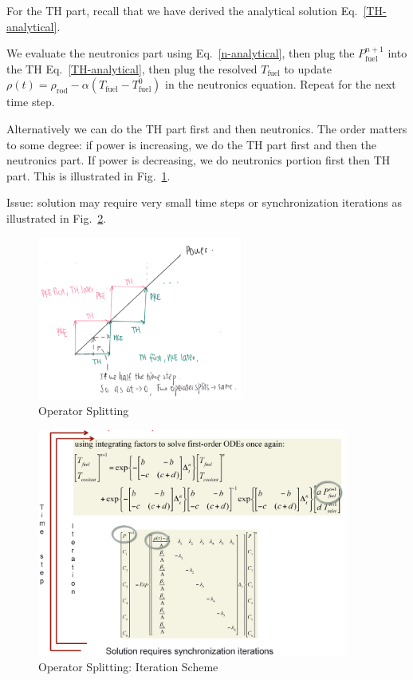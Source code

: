 \documentclass{school-22.211-notes}
\begin{document}
For the TH part, recall that we have derived the analytical solution Eq.~\ref{TH-analytical}.

\clearpage
{}
We evaluate the neutronics part using Eq.~\ref{n-analytical}, then plug the $P_{\mathrm{fuel}}^{n+1}$ into the TH Eq.~\ref{TH-analytical}, then plug the resolved $T_{\mathrm{fuel}}$ to update $\rho(t) = \rho_{\mathrm{rod}} - \alpha (T_{\mathrm{fuel}} - T_{\mathrm{fuel}}^0)$ in the neutronics equation. Repeat for the next time step. 

Alternatively we can do the TH part first and then neutronics. The order matters to some degree: if power is increasing, we do the TH part first and then the neutronics part. If power is decreasing, we do neutronics portion first then TH part. This is illustrated in Fig.~\ref{os}. 

Issue: solution may require very small time steps or synchronization iterations as illustrated in Fig.~\ref{os-is}. 

\begin{figure}[ht]
  \centering
  \includegraphics[width=0.6\textwidth]{images/pke/operator-split.png}
  \caption{Operator Splitting} \label{os}
\end{figure}

\begin{figure}[ht]
  \centering
  \includegraphics[width=4in]{images/pke/operator-split-2.png}
  \caption{Operator Splitting: Iteration Scheme} \label{os-is}
\end{figure}
\end{document}
